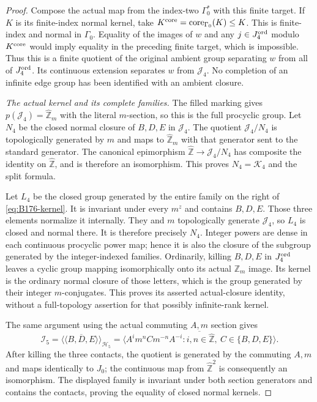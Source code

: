 \begin{proof}
Compose the actual map from the index-two \(\Gamma _0^*\) with this
finite target. If \(K\) is its finite-index normal kernel, take
\(K^{\rm core}=\operatorname{core}_{\Gamma _0}(K)\le K\).
This is finite-index and normal in \(\Gamma _0\). Equality of the
images of \(w\) and any \(j\in J_4^{\rm ord}\) modulo \(K^{\rm core}\)
would imply equality in the preceding finite target, which is impossible.
Thus this is a finite quotient of the original ambient group separating
\(w\) from all of \(J_4^{\rm ord}\). Its continuous extension separates
\(w\) from \(\mathcal J_4\). No completion of an infinite edge group
has been identified with an ambient closure.

\emph{The actual kernel and its complete families.}
The filled marking gives \(p(\mathcal J_4)=\widehat{\mathbb Z}_m\)
with the literal \(m\)-section, so this is the full procyclic group.
Let \(N_4\) be the closed normal closure of \(B,D,E\) in
\(\mathcal J_4\). The quotient \(\mathcal J_4/N_4\) is topologically
generated by \(m\) and maps to \(\widehat{\mathbb Z}_m\) with that
generator sent to the standard generator. The canonical epimorphism
\(\widehat{\mathbb Z}\to\mathcal J_4/N_4\) has composite the identity
on \(\widehat{\mathbb Z}\), and is therefore an isomorphism. This
proves \(N_4=\mathcal K_4\) and the split formula.

Let \(L_4\) be the closed group generated by the entire family on the
right of \eqref{eq:B176-kernel}. It is invariant under every \(m^z\)
and contains \(B,D,E\). Those three elements normalize it internally.
They and \(m\) topologically generate \(\mathcal J_4\), so \(L_4\)
is closed and normal there. It is therefore precisely \(N_4\).
Integer powers are dense in each continuous procyclic power map; hence
it is also the closure of the subgroup generated by the integer-indexed
families. Ordinarily, killing \(B,D,E\) in \(J_4^{\rm ord}\) leaves
a cyclic group mapping isomorphically onto its actual \(\mathbb Z_m\)
image. Its kernel is the ordinary normal closure of those letters, which
is the group generated by their integer \(m\)-conjugates. This proves
its asserted actual-closure identity, without a full-topology assertion
for that possibly infinite-rank kernel.

The same argument using the actual commuting \(A,m\) section gives
\[
 \mathcal I_5=
 \overline{\langle\!\langle B,D,E\rangle\!\rangle}_{\mathcal H_5}
 =\overline{\langle A^i m^n C m^{-n}A^{-i}:
       i,n\in\widehat{\mathbb Z},\ C\in\{B,D,E\}\rangle}.
\]
After killing the three contacts, the quotient is generated by the
commuting \(A,m\) and maps identically to \(J_0\); the continuous
map from \(\widehat{\mathbb Z}^2\) is consequently an isomorphism.
The displayed family is invariant under both section generators and
contains the contacts, proving the equality of closed normal kernels.


\end{proof}
